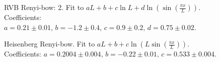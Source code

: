 \documentclass[prl,aps,twocolumn,floatfix,amsmath,amssymb,superscriptaddress,tightenlines]{revtex4}
\begin{document}
\begin{figure}[h]
  \begin{center}
  \end{center}
  \caption{RVB Renyi-bow: 2. Fit to $a L + b + c \ln L + d \ln \left( \sin \left( \frac{\pi x}{L} \right) \right).$ Coefficients: $a = 0.21\pm 0.01, \, b = -1.2 \pm 0.4, \, c = 0.9\pm 0.2, \, d = 0.75 \pm 0.02$.}
  \label{fig:2}
\end{figure}

\begin{figure}[h]
  \begin{center}
  \end{center}
  \caption{Heisenberg Renyi-bow. Fit to $a L + b + c \ln \left( L \sin \left( \frac{\pi x}{L} \right) \right).$ Coefficients: $a = 0.2004\pm 0.004, \, b = -0.22 \pm 0.01, \, c = 0.533\pm 0.004$.}
  \label{fig:3}
\end{figure}
\end{document}
